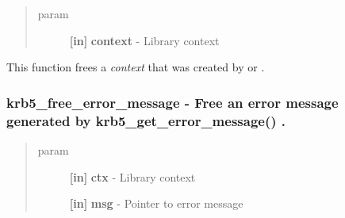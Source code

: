 \documentclass[letterpaper,10pt,english]{sphinxmanual}
\begin{document}
\begin{fulllineitems}
\label{appdev/refs/api/krb5_free_context:krb5_free_context}
\end{fulllineitems}

\begin{quote}\begin{description}
\item[{param}] \leavevmode
\textbf{{[}in{]}} \textbf{context} - Library context

\end{description}\end{quote}

This function frees a \emph{context} that was created by {\hyperref[appdev/refs/api/krb5_init_context:krb5_init_context]{}} or {\hyperref[appdev/refs/api/krb5_init_secure_context:krb5_init_secure_context]{}} .


\subsubsection{krb5\_free\_error\_message -  Free an error message generated by krb5\_get\_error\_message() .}
\label{appdev/refs/api/krb5_free_error_message:krb5-free-error-message-free-an-error-message-generated-by-krb5-get-error-message}\label{appdev/refs/api/krb5_free_error_message::doc}

\begin{fulllineitems}
\label{appdev/refs/api/krb5_free_error_message:krb5_free_error_message}
\end{fulllineitems}

\begin{quote}\begin{description}
\item[{param}] \leavevmode
\textbf{{[}in{]}} \textbf{ctx} - Library context

\textbf{{[}in{]}} \textbf{msg} - Pointer to error message

\end{description}\end{quote}
\end{document}
